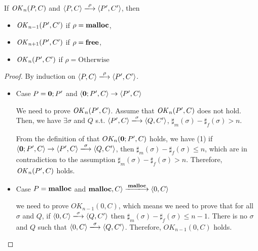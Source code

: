 

\begin{lemma}
\label{lem:okPreserved}
If \(\mathit{OK}_n(P, C)\) and \( \langle P, C \rangle \xlongrightarrow{\rho} \langle P', C' \rangle\), then
\begin{itemize}
\item \(\mathit{OK}_{n-1}(P', C')\) if \(\rho = \mathbf{malloc}\),
\item \(\mathit{OK}_{n+1}(P', C')\) if \(\rho = \mathbf{free}\),
\item \(\mathit{OK}_n(P', C')\) if \(\rho = \mbox{Otherwise}  \)
\end{itemize}
\end{lemma}

\begin{proof}
By induction on \(\langle P, C \rangle \xlongrightarrow{\rho} \langle P', C' \rangle \).

\begin{itemize}

\item Case \(P = {\bf 0};P'\) and \( \langle {\bf 0};P', C \rangle \rightarrow \langle P', C \rangle\)

  We need to prove \(\mathit{OK}_n(P', C)\).  Assume that \(\mathit{OK}_n(P', C)\)
  does not hold. Then, we have \( \exists \sigma \) and \(Q\) s.t. \(
  \langle P', C \rangle \xlongrightarrow{\sigma} \langle Q, C' \rangle
  \), \(\sharp_{m}(\sigma) - \sharp_{f}(\sigma) > n\).

  From the definition of that \(OK_n({\bf 0};P', C)\) holds, we have
  (1) if \( \langle {\bf 0};P', C \rangle \rightarrow \langle P', C
  \rangle \xlongrightarrow{\sigma} \langle Q, C' \rangle \), then
  \(\sharp_m(\sigma) - \sharp_f(\sigma) \le n \), which are in
  contradiction to the assumption \(\sharp_{m}(\sigma) -
  \sharp_{f}(\sigma) > n\). Therefore, \(\mathit{OK}_n(P', C)\) holds.

\item Case \(P = \mathbf{malloc}\) and \(\Malloc, C \rangle \xlongrightarrow{\Malloc} \langle
          0, C \rangle\)

  we need to prove \(OK_{n-1}(0, C)\), which means we need to prove
  that for all \(\sigma\) and \(Q\), if \(\langle 0, C \rangle
  \xlongrightarrow{\sigma} \langle Q, C'\rangle\) then
  \(\sharp_{m}(\sigma) - \sharp_{f}(\sigma) \le n - 1\). There is no
  \(\sigma\) and \(Q\) such that \(\langle 0, C \rangle
  \xlongrightarrow{\sigma} \langle Q, C'\rangle\). Therefore,
  \(OK_{n-1}(0, C)\) holds.


\end{itemize}
\end{proof}
